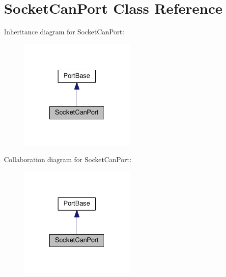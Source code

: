 \hypertarget{classSocketCanPort}{}\section{Socket\+Can\+Port Class Reference}
\label{classSocketCanPort}


Inheritance diagram for Socket\+Can\+Port\+:
\nopagebreak
\begin{figure}[H]
\begin{center}
\leavevmode
\includegraphics[width=163pt]{classSocketCanPort__inherit__graph}
\end{center}
\end{figure}


Collaboration diagram for Socket\+Can\+Port\+:
\nopagebreak
\begin{figure}[H]
\begin{center}
\leavevmode
\includegraphics[width=163pt]{classSocketCanPort__coll__graph}
\end{center}
\end{figure}
